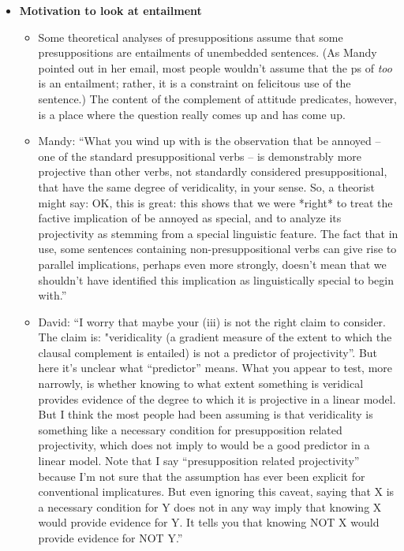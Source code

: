 \documentclass[11pt,fleqn]{article}
\newcommand{\6}{\mbox{$[\hspace*{-.6mm}[$}}
\newcommand{\9}{\mbox{$]\hspace*{-.6mm}]$}}
\begin{document}
{\begin{itemize}
\item {\bf Motivation to look at entailment}

\begin{itemize}

\item Some theoretical analyses of presuppositions assume that some presuppositions are entailments of unembedded sentences. (As Mandy pointed out in her email, most people wouldn't assume that the ps of {\em too} is an entailment; rather, it is a constraint on felicitous use of the sentence.) The content of the complement of attitude predicates, however, is a place where the question really comes up and has come up.

\item Mandy: ``What you wind up with is the observation that be annoyed -- one of the standard presuppositional verbs -- is demonstrably more projective than other verbs, not standardly considered presuppositional, that have the same degree of veridicality, in your sense. So, a theorist might say: OK, this is great: this shows that we were *right* to treat the factive implication of be annoyed as special, and to analyze its projectivity as stemming from a special linguistic feature. The fact that in use, some sentences containing non-presuppositional verbs can give rise to parallel implications, perhaps even more strongly, doesn't mean that we shouldn't have identified this implication as linguistically special to begin with.''

\item David: ``I worry that maybe your (iii) is not the right claim to consider. The claim is: "veridicality (a gradient measure of the extent to which the clausal complement is entailed) is not a predictor of projectivity”. But here it’s unclear what “predictor” means. What you appear to test, more narrowly, is whether knowing to what extent something is veridical provides evidence of the degree to which it is projective in a linear model. But I think the most people had been assuming is that veridicality is something like a necessary condition for presupposition related projectivity, which does not imply to would be a good predictor in a linear model. Note that I say “presupposition related projectivity” because I’m not sure that the assumption has ever been explicit for conventional implicatures. But even ignoring this caveat, saying that X is a necessary condition for Y does not in any way imply that knowing X would provide evidence for Y. It tells you that knowing NOT X would provide evidence for NOT Y.''


\end{itemize}
\end{itemize}}
\end{document}
